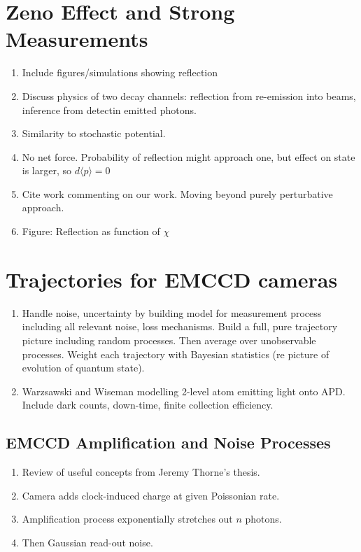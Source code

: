 \section{Zeno Effect and Strong Measurements}

\begin{enumerate}
  \item Include figures/simulations showing reflection
  \item Discuss physics of two decay channels: reflection from re-emission into beams, inference from 
    detectin emitted photons.
  \item Similarity to stochastic potential.  
  \item No net force.  Probability of reflection might approach one, but effect on 
    state is larger, so $d\langle p\rangle = 0$
  \item Cite work commenting on our work.  Moving beyond purely perturbative approach.  
  \item Figure: Reflection as function of $\chi$
\end{enumerate}

\section{Trajectories for EMCCD cameras}

\begin{enumerate}
  \item Handle noise, uncertainty by building model for measurement process
    including all relevant noise, loss mechanisms.  Build a full, pure 
    trajectory picture including random processes.
    Then average over unobservable processes.   Weight each trajectory
    with Bayesian statistics (re picture of evolution of quantum state). 
  \item Warzsawski and Wiseman modelling 2-level atom emitting light onto 
    APD.  Include dark counts, down-time, finite collection efficiency.
\end{enumerate}


\subsection{EMCCD Amplification and Noise Processes}

\begin{enumerate}
  \item Review of useful concepts from Jeremy Thorne's thesis.  
  \item Camera adds clock-induced charge at given Poissonian rate.
  \item Amplification process exponentially stretches out $n$ photons.
  \item Then Gaussian read-out noise.  
\end{enumerate}

